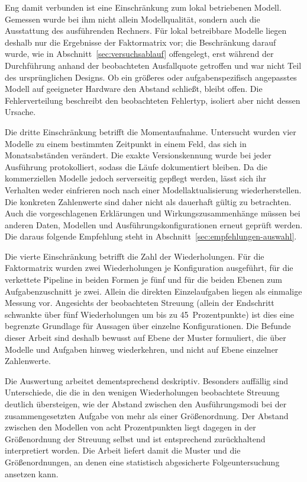 Eng damit verbunden ist eine Einschränkung zum lokal betriebenen Modell. Gemessen wurde bei ihm nicht allein Modellqualität, sondern auch die Ausstattung des ausführenden Rechners. Für lokal betreibbare Modelle liegen deshalb nur die Ergebnisse der Faktormatrix vor; die Beschränkung darauf wurde, wie in Abschnitt~\ref{sec:versuchsablauf} offengelegt, erst während der Durchführung anhand der beobachteten Ausfallquote getroffen und war nicht Teil des ursprünglichen Designs. Ob ein größeres oder aufgabenspezifisch angepasstes Modell auf geeigneter Hardware den Abstand schließt, bleibt offen. Die Fehlerverteilung beschreibt den beobachteten Fehlertyp, isoliert aber nicht dessen Ursache.

Die dritte Einschränkung betrifft die Momentaufnahme. Untersucht wurden vier Modelle zu einem bestimmten Zeitpunkt in einem Feld, das sich in Monatsabständen verändert. Die exakte Versionskennung wurde bei jeder Ausführung protokolliert, sodass die Läufe dokumentiert bleiben. Da die kommerziellen Modelle jedoch serverseitig gepflegt werden, lässt sich ihr Verhalten weder einfrieren noch nach einer Modellaktualisierung wiederherstellen. Die konkreten Zahlenwerte sind daher nicht als dauerhaft gültig zu betrachten. Auch die vorgeschlagenen Erklärungen und Wirkungszusammenhänge müssen bei anderen Daten, Modellen und Ausführungskonfigurationen erneut geprüft werden. Die daraus folgende Empfehlung steht in Abschnitt~\ref{sec:empfehlungen-auswahl}.

Die vierte Einschränkung betrifft die Zahl der Wiederholungen. Für die Faktormatrix wurden zwei Wiederholungen je Konfiguration ausgeführt, für die verkettete Pipeline in beiden Formen je fünf und für die beiden Ebenen zum Aufgabenzuschnitt je zwei. Allein die direkten Einzelaufgaben liegen als einmalige Messung vor. Angesichts der beobachteten Streuung (allein der Endschritt schwankte über fünf Wiederholungen um bis zu 45~Prozentpunkte) ist dies eine begrenzte Grundlage für Aussagen über einzelne Konfigurationen. Die Befunde dieser Arbeit sind deshalb bewusst auf Ebene der Muster formuliert, die über Modelle und Aufgaben hinweg wiederkehren, und nicht auf Ebene einzelner Zahlenwerte.

Die Auswertung arbeitet dementsprechend deskriptiv. Besonders auffällig sind Unterschiede, die die in den wenigen Wiederholungen beobachtete Streuung deutlich übersteigen, wie der Abstand zwischen den Ausführungsmodi bei der zusammengesetzten Aufgabe von mehr als einer Größenordnung. Der Abstand zwischen den Modellen von acht Prozentpunkten liegt dagegen in der Größenordnung der Streuung selbst und ist entsprechend zurückhaltend interpretiert worden. Die Arbeit liefert damit die Muster und die Größenordnungen, an denen eine statistisch abgesicherte Folgeuntersuchung ansetzen kann.


